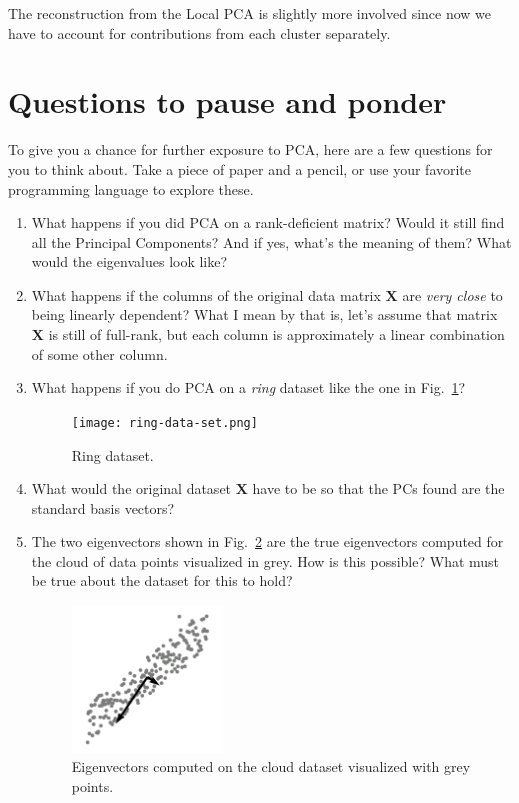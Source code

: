 \documentclass[10pt,twocolumn]{article}
\begin{document}
The reconstruction from the Local PCA is slightly more involved since now we have to account for contributions from each cluster separately.







\section{Questions to pause and ponder} \label{app:questions}

To give you a chance for further exposure to PCA,  here are a few questions for you to think about. Take a piece of paper and a pencil, or use your favorite programming language to explore these.

\begin{enumerate}
\item What happens if you did PCA on a rank-deficient matrix? Would it still find all the Principal Components? And if yes, what's the meaning of them? What would the eigenvalues look like?
\item What happens if the columns of the original data matrix $\mathbf{X}$ are \textit{very close} to being linearly dependent? What I mean by that is, let's assume that matrix $\mathbf{X}$ is still of full-rank, but each column is approximately a linear combination of some other column.
\item What happens if you do PCA on a \textit{ring} dataset like the one in Fig.~\ref{fig:ring-data-set}?
\begin{figure}[H]
\centering\texttt{[image: ring-data-set.png]}
\caption{Ring dataset.}
\label{fig:ring-data-set}
\end{figure}
\item What would the original dataset $\mathbf{X}$ have to be so that the PCs found are the standard basis vectors?
\item The two eigenvectors shown in Fig.~\ref{fig:eigenvectors-question} are the true eigenvectors computed for the cloud of data points visualized in grey. How is this possible? What must be true about the dataset for this to hold?
\begin{figure}[H]
\centering\includegraphics[width=4cm]{eigenvectors-question.pdf}
\caption{Eigenvectors computed on the cloud dataset visualized with grey points.}
\label{fig:eigenvectors-question}
\end{figure}
\end{enumerate}
\end{document}
